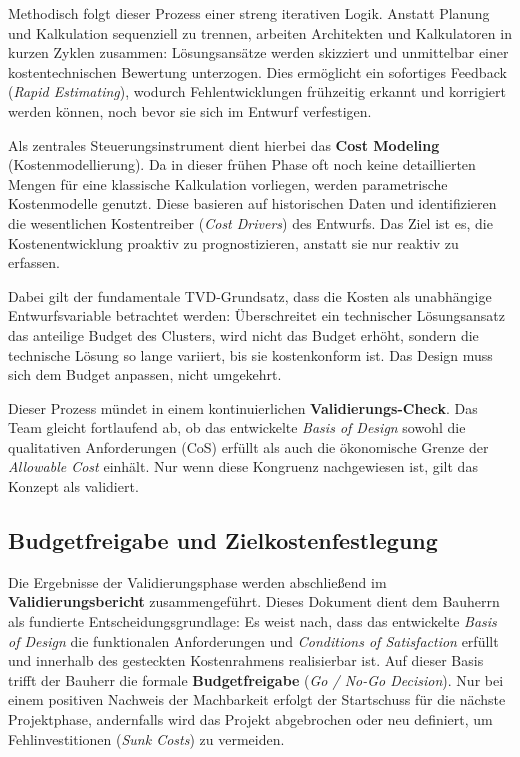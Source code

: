 \clearpage

Methodisch folgt dieser Prozess einer streng iterativen Logik. Anstatt Planung und Kalkulation sequenziell zu trennen, arbeiten Architekten und Kalkulatoren in kurzen Zyklen zusammen: Lösungsansätze werden skizziert und unmittelbar einer kostentechnischen Bewertung unterzogen. Dies ermöglicht ein sofortiges Feedback (\textit{Rapid Estimating}), wodurch Fehlentwicklungen frühzeitig erkannt und korrigiert werden können, noch bevor sie sich im Entwurf verfestigen.\autocite[Vgl.][S.~15 f]{ballard_target_2012}

Als zentrales Steuerungsinstrument dient hierbei das \textbf{Cost Modeling} (Kostenmodellierung). Da in dieser frühen Phase oft noch keine detaillierten Mengen für eine klassische Kalkulation vorliegen, werden parametrische Kostenmodelle genutzt. Diese basieren auf historischen Daten und identifizieren die wesentlichen Kostentreiber (\textit{Cost Drivers}) des Entwurfs. Das Ziel ist es, die Kostenentwicklung proaktiv zu prognostizieren, anstatt sie nur reaktiv zu erfassen. \autocite[Vgl.][S.~5]{ballard_target_2025}

Dabei gilt der fundamentale \acs{TVD}-Grundsatz, dass die Kosten als unabhängige Entwurfsvariable betrachtet werden: Überschreitet ein technischer Lösungsansatz das anteilige Budget des Clusters, wird nicht das Budget erhöht, sondern die technische Lösung so lange variiert, bis sie kostenkonform ist. Das Design muss sich dem Budget anpassen, nicht umgekehrt.\autocite[Vgl.][S.~14]{ballard_target_2012}

Dieser Prozess mündet in einem kontinuierlichen \textbf{Validierungs-Check}. Das Team gleicht fortlaufend ab, ob das entwickelte \textit{Basis of Design} sowohl die qualitativen Anforderungen (\acs{CoS}) erfüllt als auch die ökonomische Grenze der \textit{Allowable Cost} einhält. Nur wenn diese Kongruenz nachgewiesen ist, gilt das Konzept als validiert. \autocite[Vgl.][S.~31]{hill_target_2017}

\subsection{Budgetfreigabe und Zielkostenfestlegung}
\label{sec:4.3.3}

Die Ergebnisse der Validierungsphase werden abschließend im \textbf{Validierungsbericht} zusammengeführt. Dieses Dokument dient dem Bauherrn als fundierte Entscheidungsgrundlage: Es weist nach, dass das entwickelte \textit{Basis of Design} die funktionalen Anforderungen und \textit{Conditions of Satisfaction} erfüllt und innerhalb des gesteckten Kostenrahmens realisierbar ist. Auf dieser Basis trifft der Bauherr die formale \textbf{Budgetfreigabe} (\textit{Go / No-Go Decision}). Nur bei einem positiven Nachweis der Machbarkeit erfolgt der Startschuss für die nächste Projektphase, andernfalls wird das Projekt abgebrochen oder neu definiert, um Fehlinvestitionen (\textit{Sunk Costs}) zu vermeiden. \autocite[Vgl.][S.~15]{ballard_target_2025}

